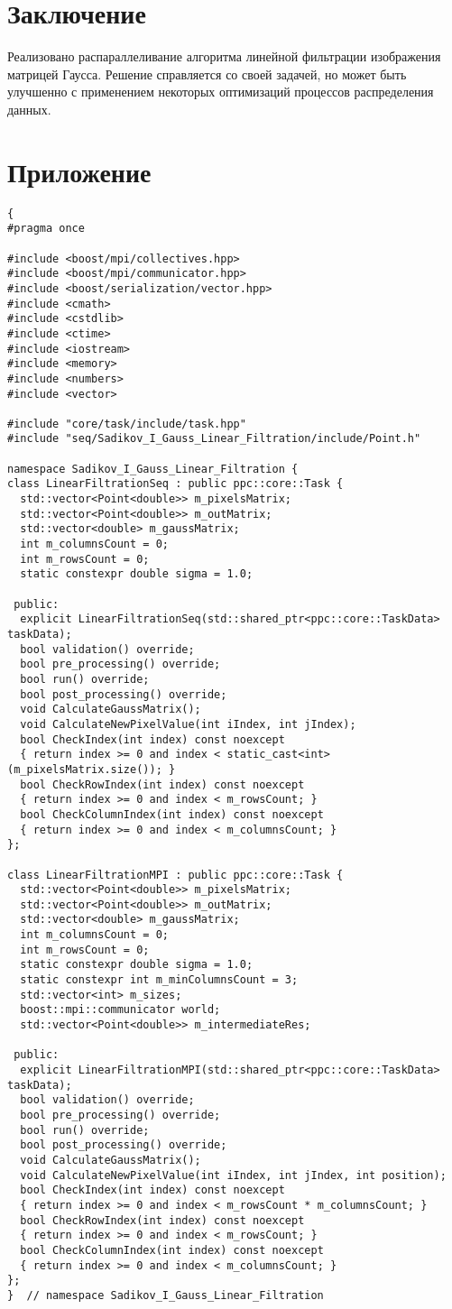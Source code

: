 \documentclass[14pt]{article}
\begin{document}
\section{Заключение}
Реализовано распараллеливание алгоритма линейной фильтрации изображения матрицей Гаусса. Решение справляется со своей задачей, но может быть улучшенно с применением некоторых оптимизаций процессов распределения данных.
\newpage
\section{Приложение}
\begin{verbatim}{
#pragma once

#include <boost/mpi/collectives.hpp>
#include <boost/mpi/communicator.hpp>
#include <boost/serialization/vector.hpp>
#include <cmath>
#include <cstdlib>
#include <ctime>
#include <iostream>
#include <memory>
#include <numbers>
#include <vector>

#include "core/task/include/task.hpp"
#include "seq/Sadikov_I_Gauss_Linear_Filtration/include/Point.h"

namespace Sadikov_I_Gauss_Linear_Filtration {
class LinearFiltrationSeq : public ppc::core::Task {
  std::vector<Point<double>> m_pixelsMatrix;
  std::vector<Point<double>> m_outMatrix;
  std::vector<double> m_gaussMatrix;
  int m_columnsCount = 0;
  int m_rowsCount = 0;
  static constexpr double sigma = 1.0;

 public:
  explicit LinearFiltrationSeq(std::shared_ptr<ppc::core::TaskData> taskData);
  bool validation() override;
  bool pre_processing() override;
  bool run() override;
  bool post_processing() override;
  void CalculateGaussMatrix();
  void CalculateNewPixelValue(int iIndex, int jIndex);
  bool CheckIndex(int index) const noexcept 
  { return index >= 0 and index < static_cast<int>(m_pixelsMatrix.size()); }
  bool CheckRowIndex(int index) const noexcept 
  { return index >= 0 and index < m_rowsCount; }
  bool CheckColumnIndex(int index) const noexcept 
  { return index >= 0 and index < m_columnsCount; }
};

class LinearFiltrationMPI : public ppc::core::Task {
  std::vector<Point<double>> m_pixelsMatrix;
  std::vector<Point<double>> m_outMatrix;
  std::vector<double> m_gaussMatrix;
  int m_columnsCount = 0;
  int m_rowsCount = 0;
  static constexpr double sigma = 1.0;
  static constexpr int m_minColumnsCount = 3;
  std::vector<int> m_sizes;
  boost::mpi::communicator world;
  std::vector<Point<double>> m_intermediateRes;

 public:
  explicit LinearFiltrationMPI(std::shared_ptr<ppc::core::TaskData> taskData);
  bool validation() override;
  bool pre_processing() override;
  bool run() override;
  bool post_processing() override;
  void CalculateGaussMatrix();
  void CalculateNewPixelValue(int iIndex, int jIndex, int position);
  bool CheckIndex(int index) const noexcept 
  { return index >= 0 and index < m_rowsCount * m_columnsCount; }
  bool CheckRowIndex(int index) const noexcept 
  { return index >= 0 and index < m_rowsCount; }
  bool CheckColumnIndex(int index) const noexcept 
  { return index >= 0 and index < m_columnsCount; }
};
}  // namespace Sadikov_I_Gauss_Linear_Filtration
\end{verbatim}
\end{document}
